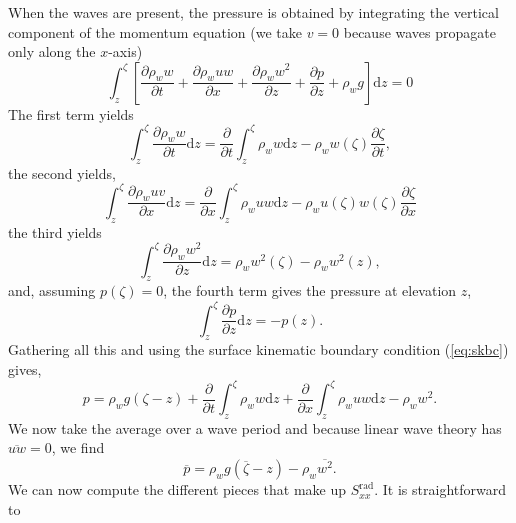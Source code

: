 When the waves are present, the pressure is obtained by integrating the vertical component of the 
momentum equation  (we take $v=0$ because waves propagate only along the $x$-axis) 
\begin{equation}
    \int_z^\zeta \left[ \frac{\partial \rho_w w}{\partial t}
                + \frac{\partial \rho_w uw}{\partial x}
                + \frac{\partial\rho_w w^2}{\partial z}
                + \frac{\partial p}{\partial z}
                +\rho_w g\right] {\mathrm d}z=0
\end{equation}
The first term yields
\begin{equation}
    \int_z^\zeta \frac{\partial \rho_w w }{\partial t} {\mathrm d}z
    =\frac{\partial }{\partial t} \int_z^\zeta \rho_w w {\mathrm d}z
    - \rho_w w\left(\zeta\right)\frac{\partial \zeta}{\partial t},
\end{equation}
the second yields, 
\begin{equation}
    \int_z^\zeta \frac{\partial \rho_w uv}{\partial x} {\mathrm d}z
        =\frac{\partial }{\partial x}  \int_z^\zeta \rho_w uw {\mathrm d}z
        -\rho_w u\left(\zeta\right)w\left(\zeta\right)
        \frac{\partial \zeta}{\partial x}
\end{equation}
the third yields 
\begin{equation}
    \int_z^\zeta \frac{\partial \rho_w w^2}{\partial z} {\mathrm d}z
        =\rho_w w^2\left(\zeta\right)-\rho_w w^2\left(z\right),
\end{equation}
and, assuming $p\left(\zeta\right)=0$, the fourth term gives the pressure at elevation $z$, 
\begin{equation}
    \int_z^\zeta \frac{\partial p}{\partial z} {\mathrm d}z=-p\left(z\right).
\end{equation}
Gathering all this and using the surface kinematic boundary condition (\ref{eq:skbc}) gives, 
\begin{equation}
p=\rho_w g \left(\zeta-z\right) +
    \frac{\partial }{\partial t} \int_z^\zeta \rho_w w {\mathrm d}z
    +\frac{\partial }{\partial x} \int_z^\zeta \rho_w uw {\mathrm d}z
    -\rho_w w^2.
\end{equation}
We now take the average over a wave period and because linear wave theory has $\overline{uw}=0$, we find
\begin{equation}
    \overline{p}=\rho_w g \left(\overline{\zeta}-z\right) -\rho_w \overline{w^2}.
\end{equation}
We can now compute the different pieces that make up $S^{\mathrm{rad}}_{xx}$. It is straightforward to 

